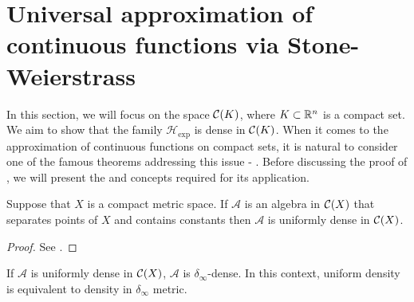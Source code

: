 \newpage
\section{Universal approximation of continuous functions via Stone-Weierstrass}
\label{section:universality:continuous:stone-weierstrass}
In this section, we will focus on the space ${\mathcal C}(K)$, where $K \subset {\mathbb R}^n$ is a compact set. We aim to show that the family $\mathcal{H}_{\exp}$ is dense in ${\mathcal C}(K)$. When it comes to the approximation of continuous functions on compact sets, it is natural to consider one of the famous theorems addressing this issue - . Before discussing the proof of , we will present the  and concepts required for its application.

\begin{theorem*}
Suppose that $X$ is a compact metric space. If $\mathcal{A}$ is an algebra in ${\mathcal C}(X)$ that separates points of $X$ and contains constants then $\mathcal{A}$ is uniformly dense in ${\mathcal C}(X)$.
\end{theorem*}
\begin{proof}
See .
\end{proof}
\begin{remark}
If $\mathcal{A}$ is uniformly dense in ${\mathcal C}(X)$, $\mathcal{A}$ is $\delta_\infty$-dense. In this context, uniform density is equivalent to density in $\delta_\infty$ metric. 
\end{remark}


